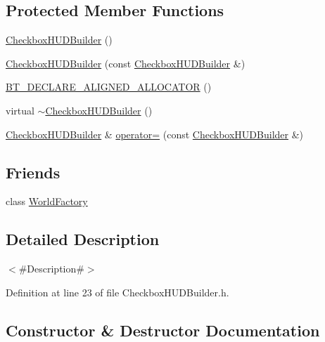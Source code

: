 \subsection*{Protected Member Functions}
\begin{DoxyCompactItemize}
\item 
\mbox{\hyperlink{classnjli_1_1_checkbox_h_u_d_builder_a141ffeba073d9bc717b94a954bb6896f}{Checkbox\+H\+U\+D\+Builder}} ()
\item 
\mbox{\hyperlink{classnjli_1_1_checkbox_h_u_d_builder_a12a7752a2d8f4978f46031123747105f}{Checkbox\+H\+U\+D\+Builder}} (const \mbox{\hyperlink{classnjli_1_1_checkbox_h_u_d_builder}{Checkbox\+H\+U\+D\+Builder}} \&)
\item 
\mbox{\hyperlink{classnjli_1_1_checkbox_h_u_d_builder_a84d0f7ce28c152cbf174ebe89d8e0b83}{B\+T\+\_\+\+D\+E\+C\+L\+A\+R\+E\+\_\+\+A\+L\+I\+G\+N\+E\+D\+\_\+\+A\+L\+L\+O\+C\+A\+T\+OR}} ()
\item 
virtual \mbox{\hyperlink{classnjli_1_1_checkbox_h_u_d_builder_a33ea9fdae001f0825ba5909d2bee6b69}{$\sim$\+Checkbox\+H\+U\+D\+Builder}} ()
\item 
\mbox{\hyperlink{classnjli_1_1_checkbox_h_u_d_builder}{Checkbox\+H\+U\+D\+Builder}} \& \mbox{\hyperlink{classnjli_1_1_checkbox_h_u_d_builder_a5d42bd65c37400db0b2bb8160ba221f1}{operator=}} (const \mbox{\hyperlink{classnjli_1_1_checkbox_h_u_d_builder}{Checkbox\+H\+U\+D\+Builder}} \&)
\end{DoxyCompactItemize}
\subsection*{Friends}
\begin{DoxyCompactItemize}
\item 
class \mbox{\hyperlink{classnjli_1_1_checkbox_h_u_d_builder_acb96ebb09abe8f2a37a915a842babfac}{World\+Factory}}
\end{DoxyCompactItemize}


\subsection{Detailed Description}
$<$\#\+Description\#$>$ 

Definition at line 23 of file Checkbox\+H\+U\+D\+Builder.\+h.



\subsection{Constructor \& Destructor Documentation}
\mbox{\label{classnjli_1_1_checkbox_h_u_d_builder_a141ffeba073d9bc717b94a954bb6896f}} 
